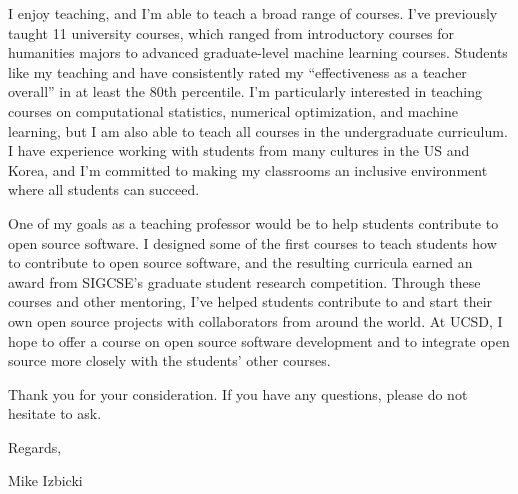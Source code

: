 \documentclass[12pt]{article}
\begin{document}
\noindent
I enjoy teaching,
and I'm able to teach a broad range of courses.
I've previously taught 11 university courses,
which ranged from introductory courses for humanities majors to advanced graduate-level machine learning courses.
Students like my teaching and have consistently rated my ``effectiveness as a teacher overall'' in at least the 80th percentile.
I'm particularly interested in teaching courses on computational statistics, numerical optimization, and machine learning,
but I am also able to teach all courses in the undergraduate curriculum.
I have experience working with students from many cultures in the US and Korea,
and I'm committed to making my classrooms an inclusive environment where all students can succeed.

\noindent
One of my goals as a teaching professor would be to help students contribute to open source software.
I designed some of the first courses to teach students how to contribute to open source software,
and the resulting curricula earned an award from SIGCSE's graduate student research competition.
Through these courses and other mentoring, 
I've helped students contribute to and start their own open source projects with collaborators from around the world.
At UCSD, I hope to offer a course on open source software development
and to integrate open source more closely with the students' other courses.

\noindent
Thank you for your consideration.
If you have any questions,
please do not hesitate to ask.

\noindent
Regards,

\vspace{-0.10in}
\noindent
Mike Izbicki
\end{document}
